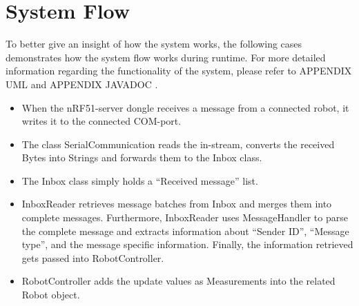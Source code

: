 \section{System Flow}




To better give an insight of how the system works, the following cases demonstrates how the system flow works during runtime. For more detailed information regarding the functionality of the system, please refer to APPENDIX UML and APPENDIX JAVADOC .

\begin{itemize}
    \item When the nRF51-server dongle receives a message from a connected robot, it writes it to the connected COM-port.
    \item The class SerialCommunication reads the in-stream, converts the received Bytes into Strings and forwards them to the Inbox class.
    \item The Inbox class simply holds a ``Received message'' list.
    \item InboxReader retrieves message batches from Inbox and merges them into complete messages. Furthermore, InboxReader uses MessageHandler to parse the complete message and extracts information about ``Sender ID'', ``Message type'', and the message specific information. Finally, the information retrieved gets passed into RobotController.
    \item RobotController adds the update values as Measurements into the related Robot object.
\end{itemize}

